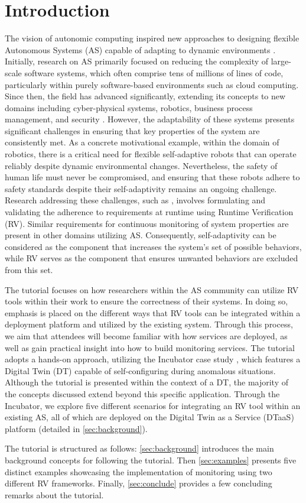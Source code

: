 \section{Introduction}

The vision of autonomic computing inspired new approaches to designing flexible Autonomous Systems (AS) capable of adapting to dynamic environments \cite{kephartVisionAutonomicComputing2003}.
Initially, research on AS primarily focused on reducing the complexity of large-scale software systems, which often comprise tens of millions of lines of code, particularly within purely software-based environments such as cloud computing.
Since then, the field has advanced significantly, extending its concepts to new domains including cyber-physical systems, robotics, business process management, and security .
However, the adaptability of these systems presents significant challenges in ensuring that key properties of the system are consistently met.
As a concrete motivational example, within the domain of robotics, there is a critical need for flexible self-adaptive robots that can operate reliably despite dynamic environmental changes.
Nevertheless, the safety of human life must never be compromised, and ensuring that these robots adhere to safety standards despite their self-adaptivity remains an ongoing challenge.
Research addressing these challenges, such as , involves formulating and validating the adherence to requirements at runtime using Runtime Verification (RV).
Similar requirements for continuous monitoring of system properties are present in other domains utilizing AS.
Consequently, self-adaptivity can be considered as the component that increases the system's set of possible behaviors, while RV serves as the component that ensures unwanted behaviors are excluded from this set.

The tutorial focuses on how researchers within the AS community can utilize RV tools within their work to ensure the correctness of their systems.
In doing so, emphasis is placed on the different ways that RV tools can be integrated within a deployment platform and utilized by the existing system.
Through this process, we aim that attendees will become familiar with how services are deployed, as well as gain practical insight into how to build monitoring services.
The tutorial adopts a hands-on approach, utilizing the Incubator case study \cite{Feng2021, Feng2022}, which features a Digital Twin (DT) capable of self-configuring during anomalous situations.
Although the tutorial is presented within the context of a DT, the majority of the concepts discussed extend beyond this specific application.
Through the Incubator, we explore five different scenarios for integrating an RV tool within an existing AS, all of which are deployed on the Digital Twin as a Service (DTaaS) platform (detailed in \cref{sec:background}).

The tutorial is structured as follows: \cref{sec:background} introduces the main background concepts for following the tutorial.
Then \cref{sec:examples} presents five distinct examples showcasing the implementation of monitoring using two different RV frameworks.
Finally, \cref{sec:conclude} provides a few concluding remarks about the tutorial.
